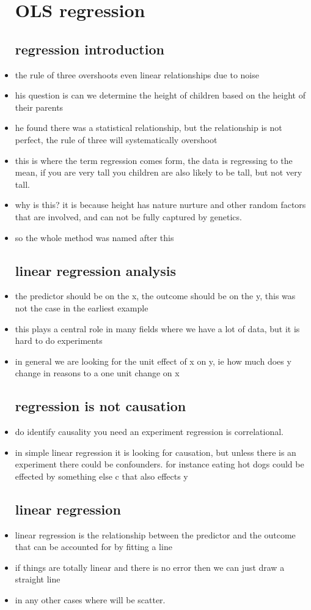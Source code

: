 \documentclass{article}
\begin{document}
\begin{itemize}
\section{OLS regression}
\subsection{regression introduction}
\item the rule of three overshoots even linear relationships due to noise
\item his question is can we determine the height of children based on the height of their parents 
\item he found there was a statistical relationship, but the relationship is not perfect, the rule of three will systematically overshoot
\item this is where the term regression comes form, the data is regressing to the mean, if you are very tall you children are also likely to be tall, but not very tall. 
\item why is this? it is because height has nature nurture and other random factors that are involved, and can not be fully captured by genetics. 
\item so the whole method was named after this 
\subsection{linear regression analysis }
\item the predictor should be on the x, the outcome should be on the y, this was not the case in the earliest example
\item this plays a central role in many fields where we have a lot of data, but it is hard to do experiments 
\item in general we are looking for the unit effect of x on y, ie how much does y change in reasons to a one unit change on x 

\subsection{regression is not causation}
\item do identify causality you need an experiment regression is correlational. 
\item in simple linear regression it is looking for causation, but unless there is an experiment there could be confounders. for instance eating hot dogs could be effected by something else c that also effects y 
\subsection{linear regression }
\item linear regression is the relationship between the predictor and the outcome that can be accounted for by fitting a line 
\item if things are totally linear and there is no error then we can just draw a straight line 
\item in any other cases where will be scatter. 

\end{itemize}
\end{document}
